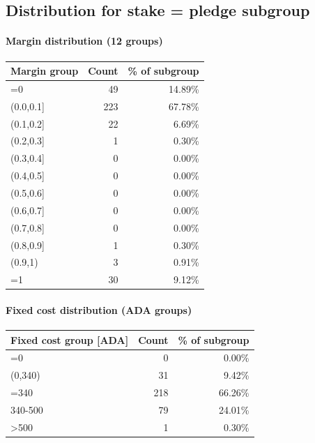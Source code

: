 \documentclass[11pt]{article}
\begin{document}
\subsection*{Distribution for stake = pledge subgroup}
\paragraph{Margin distribution (12 groups)}
\begin{table}[h]
\centering
\begin{tabular}{lrr}
\toprule
Margin group & Count & \% of subgroup \\
\midrule
{}=0 & 49 & 14.89\% \\
{}(0.0,0.1] & 223 & 67.78\% \\
{}(0.1,0.2] & 22 & 6.69\% \\
{}(0.2,0.3] & 1 & 0.30\% \\
{}(0.3,0.4] & 0 & 0.00\% \\
{}(0.4,0.5] & 0 & 0.00\% \\
{}(0.5,0.6] & 0 & 0.00\% \\
{}(0.6,0.7] & 0 & 0.00\% \\
{}(0.7,0.8] & 0 & 0.00\% \\
{}(0.8,0.9] & 1 & 0.30\% \\
{}(0.9,1) & 3 & 0.91\% \\
{}=1 & 30 & 9.12\% \\
\bottomrule
\end{tabular}
\end{table}
\paragraph{Fixed cost distribution (ADA groups)}
\begin{table}[h]
\centering
\begin{tabular}{lrr}
\toprule
Fixed cost group [ADA] & Count & \% of subgroup \\
\midrule
{}=0 & 0 & 0.00\% \\
{}(0,340) & 31 & 9.42\% \\
{}=340 & 218 & 66.26\% \\
{}340-500 & 79 & 24.01\% \\
{}>500 & 1 & 0.30\% \\
\bottomrule
\end{tabular}
\end{table}
\end{document}

